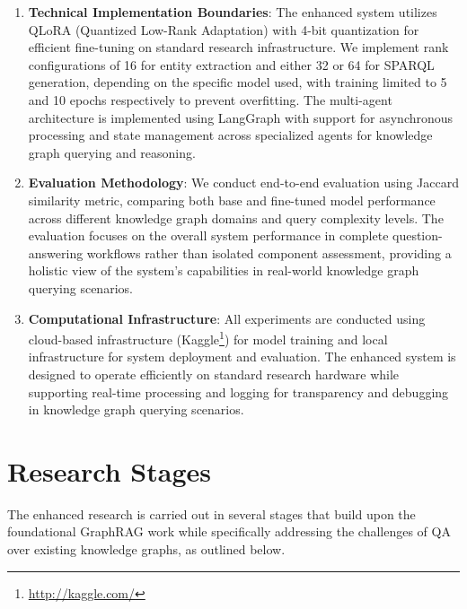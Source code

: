 \begin{enumerate}
    \item \textbf{Technical Implementation Boundaries}: The enhanced system utilizes QLoRA (Quantized Low-Rank Adaptation) with 4-bit quantization for efficient fine-tuning on standard research infrastructure. We implement rank configurations of 16 for entity extraction and either 32 or 64 for SPARQL generation, depending on the specific model used, with training limited to 5 and 10 epochs respectively to prevent overfitting. The multi-agent architecture is implemented using LangGraph with support for asynchronous processing and state management across specialized agents for knowledge graph querying and reasoning.
    
    \item \textbf{Evaluation Methodology}: We conduct end-to-end evaluation using Jaccard similarity metric, comparing both base and fine-tuned model performance across different knowledge graph domains and query complexity levels. The evaluation focuses on the overall system performance in complete question-answering workflows rather than isolated component assessment, providing a holistic view of the system's capabilities in real-world knowledge graph querying scenarios.
    
    \item \textbf{Computational Infrastructure}: All experiments are conducted using cloud-based infrastructure (Kaggle\footnote{\url{http://kaggle.com/}}) for model training and local infrastructure for system deployment and evaluation. The enhanced system is designed to operate efficiently on standard research hardware while supporting real-time processing and logging for transparency and debugging in knowledge graph querying scenarios.
\end{enumerate}

\section{Research Stages}
\label{sec:langkahPenelitian}
The enhanced research is carried out in several stages that build upon the foundational GraphRAG work while specifically addressing the challenges of QA over existing knowledge graphs, as outlined below.

